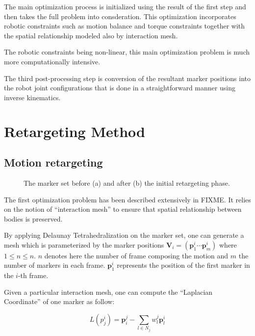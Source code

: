 \documentclass[letterpaper, 10 pt, conference]{ieeeconf}  %
\begin{document}
The main optimization process is initialized using the result of the 
first step and then takes the full problem into consderation. 
This optimization incorporates robotic constraints such as
motion balance and torque constraints together with the spatial
relationship modeled also by interaction mesh.


The robotic constraints being non-linear, this main
optimization problem is much more computationally intensive.


The third post-processing step is conversion of the resultant marker
positions into the robot joint configurations that is done in a
straightforward manner using inverse kinematics.  


\section{Retargeting Method}
\label{sec:retargeting}



\subsection{Motion retargeting}


\begin{figure}[htbp!]
  \label{fig:retargeting}
  \caption{The marker set before (a) and after (b) the initial
    retargeting phase.}
\end{figure}


The first optimization problem has been described extensively in
FIXME. It relies on the notion of ``interaction mesh'' to ensure that
spatial relationship between bodies is preserved.

By applying Delaunay Tetrahedralization \cite{FIXME} on the marker
set, one can generate a mesh which is parameterized by the marker
positions $\mathbf{V}_i = (\mathbf{p}^i_1 \cdots \mathbf{p}^i_m)$
where $1 \leq n \leq n$. $n$ denotes here the number of frame
composing the motion and $m$ the number of markers in each
frame. $\mathbf{p}^i_1$ represents the position of the first marker in
the $i$-th frame.

Given a particular interaction mesh, one can compute the ``Laplacian
Coordinate'' of one marker as follow:

\begin{equation}\label{eq:laplacian-coordinate}
L(p^i_j) = \mathbf{p}_i^j - \sum_{l \in N_j} w^j_l \mathbf{p}^i_l
\end{equation}
\end{document}
